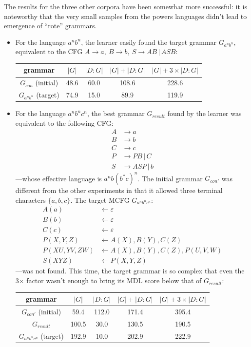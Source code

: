\documentclass{article}
\begin{document}
The results for the three other corpora have been somewhat more successful: it is noteworthy that
the very small samples from the powers languages didn't lead to emergence of ``rote'' grammars.
\begin{itemize}
  \item For the language $a^n b^n$, the learner easily found the target grammar $G_{a^n b^n}$,
    equivalent to the CFG $A\rightarrow a,\ B\rightarrow b,\ S\rightarrow AB\,|\,ASB$:
    
    \begin{tabular}{ c | c c c c }
     grammar & $|G|$ & $|D:G|$ & $|G| + |D:G|$ & $|G| + 3\times|D:G|$ \\ 
     \hline
     $G_{con}$ (initial) & 48.6 & 60.0 & 108.6 & 228.6 \\
     $G_{a^n b^n}$ (target) & 74.9 & 15.0 & 89.9 & 119.9
    \end{tabular}\vspace{1ex}

  \item For the language $a^n b^n c^n$, the best grammar $G_{result}$ found by the learner
    was equivalent to the following CFG:
    \begin{align*}
    A &\rightarrow a\\
    B &\rightarrow b\\
    C &\rightarrow c\\
    P &\rightarrow PB\,|\,C\\
    S &\rightarrow ASP\,|\,b
    \end{align*}
    ---whose effective language is $a^n b (b^{*}c)^n$.
    The initial grammar $G_{con'}$ was different from the other experiments in that it allowed
    three terminal characters $\{a,b,c\}$. The target MCFG $G_{a^n b^n c^n}$:
    \begin{align*}
    A(a) &\leftarrow\varepsilon\\
    B(b) &\leftarrow\varepsilon\\
    C(c) &\leftarrow\varepsilon\\
    P(X,Y,Z) &\leftarrow A(X),B(Y),C(Z)\\
    P(XU,YV,ZW) &\leftarrow A(X),B(Y),C(Z),P(U,V,W)\\
    S(XYZ) &\leftarrow P(X,Y,Z)
    \end{align*}
    ---was not found. This time, the target grammar is so complex that even the 3$\times$ factor
    wasn't enough to bring its MDL score below that of $G_{result}$:

    \vspace{1ex}\begin{tabular}{ c | c c c c }
     grammar & $|G|$ & $|D:G|$ & $|G| + |D:G|$ & $|G| + 3\times|D:G|$ \\ 
     \hline
     $G_{con'}$ (initial) & 59.4 & 112.0 & 171.4 & 395.4 \\
     $G_{result}$ & 100.5 & 30.0 & 130.5 & 190.5 \\
     $G_{a^n b^n c^n}$ (target) & 192.9 & 10.0 & 202.9 & 222.9
    \end{tabular}\vspace{1ex}
  

\end{itemize}
\end{document}
